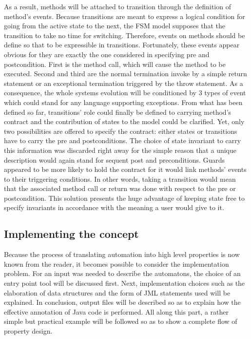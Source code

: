 As a result, methods will be attached to transition through the definition of method's events. Because transitions are meant to express a logical condition for going from the active state to the next, the FSM model supposes that the transition to take no time for switching. Therefore, events on methods should be define so that to be expressible in transitions. Fortunately, these events appear obvious for they are exactly the one considered in specifying pre and postcondition. First is the method call, which will cause the method to be executed. Second and third are the normal termination invoke by a simple return statement or an exceptional termination triggered by the throw statement. As a consequence, the whole systems evolution will be conditioned by 3 types of event which could stand for any language supporting exceptions.
From what has been defined so far, transitions' role could finally be defined to carrying method's contract and the contribution of states to the model could be clarified. Yet, only two possibilities are offered to specify the contract: either states or transitions have to carry the pre and postconditions. The choice of state invariant to carry this information was discarded right away for the simple reason that a unique description would again stand for sequent post and preconditions. Guards appeared to be more likely to hold the contract for it would link methods' events to their triggering conditions. In other words, taking a transition would mean that the associated method call or return was done with respect to the pre or postcondition. This solution presents the huge advantage of keeping state free to specify invariants in accordance with the meaning a user would give to it. 

\subsection{Implementing the concept}
Because the process of translating automation into high level properties is now known from the reader, it becomes possible to consider the implementation problem. For an input was needed to describe the automatons, the choice of an entry point tool will be discussed first. Next, implementation choices such as the elaboration of data structures and the form of JML statements used will be explained. In conclusion, output files will be described so as to explain how the effective annotation of Java code is performed. All along this part, a rather simple but practical example will be followed so as to show a complete flow of property design.

